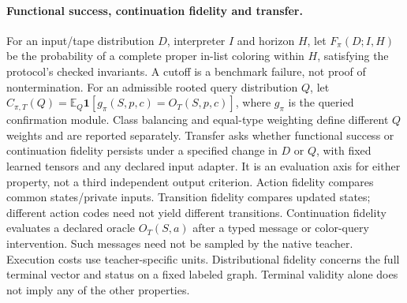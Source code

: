 \documentclass[10pt]{article}
\begin{document}
\paragraph{Functional success, continuation fidelity and transfer.}
For an input/tape distribution $D$, interpreter $I$ and horizon $H$, let
$F_\pi(D;I,H)$ be the probability of a complete proper in-list coloring
within $H$, satisfying the protocol's checked invariants. A cutoff
is a benchmark failure, not proof of nontermination. For an admissible rooted
query distribution $Q$, let
$C_{\pi,T}(Q)=\mathbb E_Q\mathbf1[g_\pi(S,p,c)=O_T(S,p,c)]$, where $g_\pi$
is the queried confirmation module. Class balancing and equal-type weighting
define different $Q$ weights and are reported separately. Transfer asks
whether functional success or continuation fidelity persists under a
specified change in $D$ or $Q$, with fixed learned tensors and any declared
input adapter. It is an evaluation axis for either property, not a third
independent output criterion. Action fidelity compares
common states/private inputs. Transition fidelity compares updated states;
different action codes need not yield different transitions. Continuation
fidelity evaluates a declared oracle $O_T(S,a)$ after a typed message or
color-query intervention. Such messages need not be sampled by the native
teacher. Execution costs use teacher-specific units. Distributional fidelity
concerns the full terminal vector and status on a fixed labeled graph.
Terminal validity alone does not imply any of the other properties.



\end{document}
